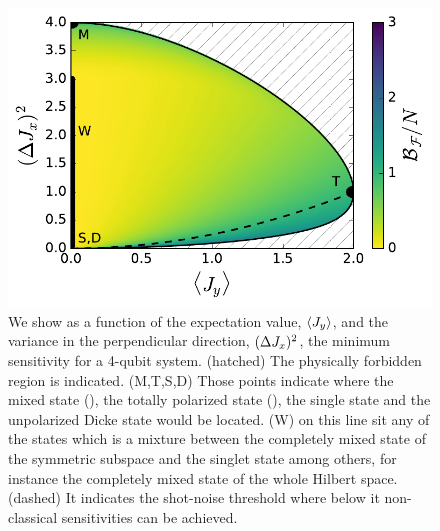\begin{figure}
  \centering
  \includegraphics[scale=.65]{img/plots/LT_spsq2d_4.pdf}
  \caption{We show as a function of the expectation value, $\langle J_y \rangle$, and the variance in the perpendicular direction, $(\Delta J_x )^2$, the minimum sensitivity for a 4-qubit system.
  (hatched) The physically forbidden region is indicated. (M,T,S,D) Those points indicate where the mixed state (), the totally polarized state (), the single state and the unpolarized Dicke state would be located. (W) on this line sit any of the states which is a mixture between the completely mixed state of the symmetric subspace and the singlet state among others, for instance the completely mixed state of the whole Hilbert space. (dashed) It indicates the shot-noise threshold where below it non-classical sensitivities can be achieved.}
  \label{fig:lt-spsq2d-4}
\end{figure}

